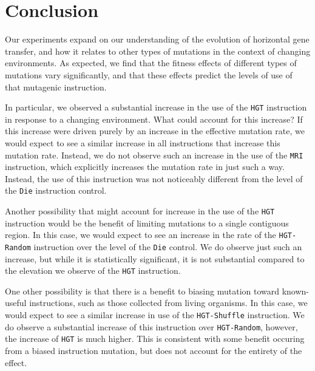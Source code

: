 \documentclass[PhD]{msu-thesis}
\begin{document}


\section{Conclusion}
Our experiments expand on our understanding of the evolution of horizontal gene transfer, and how it relates to other types of mutations in the context of changing environments. As expected, we find that the fitness effects of different types of mutations vary significantly, and that these effects predict the levels of use of that mutagenic instruction. 

In particular, we observed a substantial increase in the use of the \texttt{HGT} instruction in response to a changing environment. What could account for this increase? If this increase were driven purely by an increase in the effective mutation rate, we would expect to see a similar increase in all instructions that increase this mutation rate. Instead, we do not observe such an increase in the use of the \texttt{MRI} instruction, which explicitly increases the mutation rate in just such a way. Instead, the use of this instruction was not noticeably different from the level of the \texttt{Die} instruction control. 

Another possibility that might account for increase in the use of the \texttt{HGT} instruction would be the benefit of limiting mutations to a single contiguous region. In this case, we would expect to see an increase in the rate of the \texttt{HGT-Random} instruction over the level of the \texttt{Die} control. We do observe just such an increase, but while it is statistically significant, it is not substantial compared to the elevation we observe of the \texttt{HGT} instruction.

One other possibility is that there is a benefit to biasing mutation toward known-useful instructions, such as those collected from living organisms. In this case, we would expect to see a similar increase in use of the \texttt{HGT-Shuffle} instruction. We do observe a substantial increase of this instruction over \texttt{HGT-Random}, however, the increase of \texttt{HGT} is much higher. This is consistent with some benefit occuring from a biased instruction mutation, but does not account for the entirety of the effect. 
\end{document}
